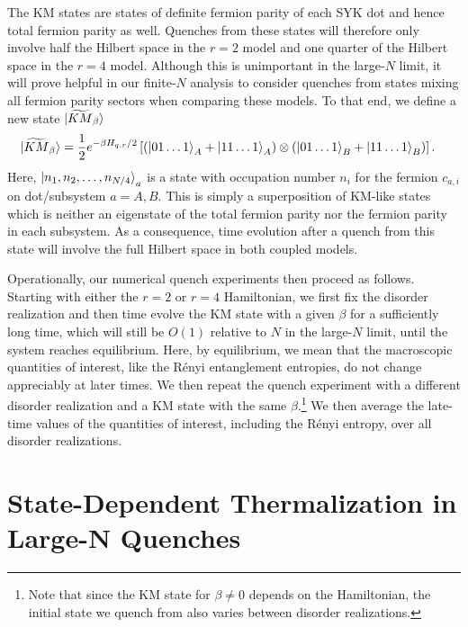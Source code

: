 \documentclass[reprint, floatfix,eqsecnum,superscriptaddress,preprint,nofootinbib,onecolumn,amsmath,amssymb,aps,prb]{revtex4-2}
\begin{document}
The KM states are states of definite fermion parity of each SYK dot and hence total fermion parity as well.
Quenches from these states will therefore only involve half the Hilbert space in the $r=2$ model and one quarter of the Hilbert space in the $r=4$ model. 
Although this is unimportant in the large-$N$ limit, it will prove helpful in our finite-$N$ analysis to consider quenches from states mixing all fermion parity sectors when comparing these models. 
To that end, we define a new state $\ket{\widetilde{KM}_\beta}$ 
\begin{align}
    \begin{split}
    \ket{\widetilde{KM}_\beta} = \frac{1}{2} & e^{-\beta H_{q,r} /2} \left[ \left( \ket{0 1 \dots 1}_A + \ket{1 1 \dots 1}_A  \right) \otimes \left( \ket{0 1 \dots 1}_B + \ket{1 1 \dots 1}_B  \right) \right]. \end{split} \label{eqn:KM-indefinite-parity}
\end{align}
Here, $\ket{n_1 , n_2, \dots, n_{N/4}}_a$ is a state with occupation number $n_i$ for the fermion $c_{a,i}$ on dot/subsystem $a=A,B$. This is simply a superposition of KM-like states which is neither an eigenstate of the total fermion parity nor the fermion parity in each subsystem. As a consequence, time evolution after a quench from this state will involve the full Hilbert space in both coupled models.

Operationally, our numerical quench experiments then proceed as follows. Starting with either the $r=2$ or $r=4$ Hamiltonian, we first fix the disorder realization and then time evolve the KM state with a given $\beta$ for a sufficiently long time, which will still be $O(1)$ relative to $N$ in the large-$N$ limit, until the system reaches equilibrium. Here, by equilibrium, we mean that the macroscopic quantities of interest, like the R\'enyi entanglement entropies, do not change appreciably at later times. We then repeat the quench experiment with a different disorder realization and a KM state with the same $\beta$.\footnote{Note that since the KM state for $\beta \neq 0$ depends on the Hamiltonian, the initial state we quench from also varies between disorder realizations.} We then average the late-time values of the quantities of interest, including the R\'enyi entropy, over all disorder realizations.

\section{State-Dependent Thermalization in Large-N Quenches \label{sec:large-N} }
\end{document}

